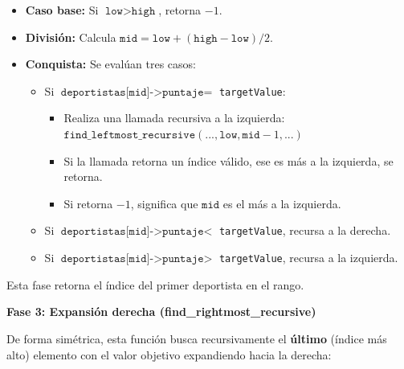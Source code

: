 \begin{itemize}
    \item \textbf{Caso base:} Si \(\texttt{low} > \texttt{high}\), retorna $-1$.
    
    \item \textbf{División:} Calcula \(\texttt{mid} = \texttt{low} + (\texttt{high} - \texttt{low}) / 2\).
    
    \item \textbf{Conquista:} Se evalúan tres casos:
    \begin{itemize}
        \item Si \(\texttt{deportistas[mid]->puntaje} =\) \texttt{targetValue}:
        \begin{itemize}
            \item Realiza una llamada recursiva a la izquierda: \(\texttt{find\_leftmost\_recursive}(\text{...}, \texttt{low}, \texttt{mid} - 1, \text{...})\)
            \item Si la llamada retorna un índice válido, ese es más a la izquierda, se retorna.
            \item Si retorna $-1$, significa que \(\texttt{mid}\) es el más a la izquierda.
        \end{itemize}
        \item Si \(\texttt{deportistas[mid]->puntaje} <\) \texttt{targetValue}, recursa a la derecha.
        \item Si \(\texttt{deportistas[mid]->puntaje} >\) \texttt{targetValue}, recursa a la izquierda.
    \end{itemize}
\end{itemize}

Esta fase retorna el índice del primer deportista en el rango.

\textbf{Fase 3: Expansión derecha (find\_rightmost\_recursive)}

De forma simétrica, esta función busca recursivamente el \textbf{último} (índice más alto) elemento con el valor objetivo expandiendo hacia la derecha:

